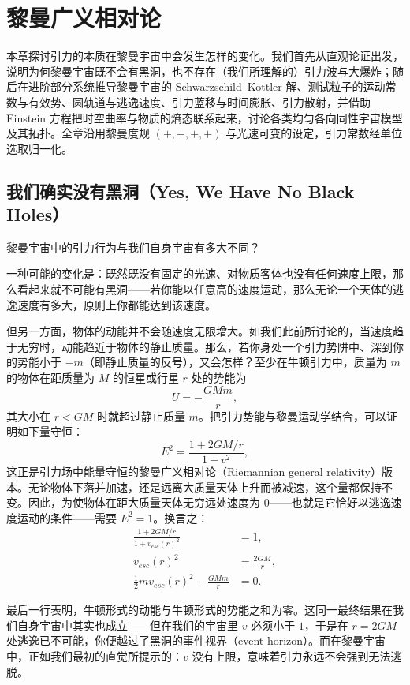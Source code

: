 \chapter{黎曼广义相对论}

本章探讨引力的本质在黎曼宇宙中会发生怎样的变化。我们首先从直观论证出发，说明为何黎曼宇宙既不会有黑洞，也不存在（我们所理解的）引力波与大爆炸；随后在进阶部分系统推导黎曼宇宙的 Schwarzschild--Kottler 解、测试粒子的运动常数与有效势、圆轨道与逃逸速度、引力蓝移与时间膨胀、引力散射，并借助 Einstein 方程把时空曲率与物质的熵态联系起来，讨论各类均匀各向同性宇宙模型及其拓扑。全章沿用黎曼度规 $(+,+,+,+)$ 与光速可变的设定，引力常数经单位选取归一化。

\section{我们确实没有黑洞（Yes, We Have No Black Holes）}

黎曼宇宙中的引力行为与我们自身宇宙有多大不同？

一种可能的变化是：既然既没有固定的光速、对物质客体也没有任何速度上限，那么看起来就不可能有黑洞——若你能以任意高的速度运动，那么无论一个天体的逃逸速度有多大，原则上你都能达到该速度。

但另一方面，物体的动能并不会随速度无限增大。如我们此前所讨论的，当速度趋于无穷时，动能趋近于物体的静止质量。那么，若你身处一个引力势阱中、深到你的势能小于 $-m$（即静止质量的反号），又会怎样？至少在牛顿引力中，质量为 $m$ 的物体在距质量为 $M$ 的恒星或行星 $r$ 处的势能为
\[
U=-\frac{GMm}{r},
\]
其大小在 $r<GM$ 时就超过静止质量 $m$。把引力势能与黎曼运动学结合，可以证明如下量守恒：
\begin{equation*}
E^{2}=\frac{1+2GM/r}{1+v^{2}},
\end{equation*}
这正是引力场中能量守恒的黎曼广义相对论（Riemannian general relativity）版本。无论物体下落并加速，还是远离大质量天体上升而被减速，这个量都保持不变。因此，为使物体在距大质量天体无穷远处速度为 $0$——也就是它恰好以逃逸速度运动的条件——需要 $E^{2}=1$。换言之：
\begin{align*}
\frac{1+2GM/r}{1+v_{esc}(r)^{2}} &= 1,\\
v_{esc}(r)^{2} &= \frac{2GM}{r},\\
\frac{1}{2}mv_{esc}(r)^{2}-\frac{GMm}{r} &= 0.
\end{align*}

最后一行表明，牛顿形式的动能与牛顿形式的势能之和为零。这同一最终结果在我们自身宇宙中其实也成立——但在我们的宇宙里 $v$ 必须小于 $1$，于是在 $r=2GM$ 处逃逸已不可能，你便越过了黑洞的事件视界（event horizon）。而在黎曼宇宙中，正如我们最初的直觉所提示的：$v$ 没有上限，意味着引力永远不会强到无法逃脱。

